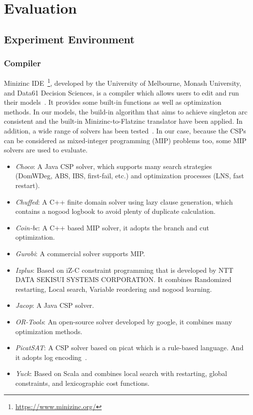 \chapter{Evaluation}
\label{cha:evaluation}
\section{Experiment Environment}
\subsection{Compiler}
\label{section:compiler}
Minizinc IDE~\footnote{\url{https://www.minizinc.org/}}, developed by the University of Melbourne, Monash University, and Data61 Decision Sciences, is a compiler which allows users to edit and run their models~\cite{r6}. It provides some built-in functions as well as optimization methods. In our models, the build-in algorithm that aims to achieve singleton arc consistent and the built-in Minizinc-to-Flatzinc translator have been applied. In addition, a wide range of solvers has been tested~\cite{r6}. In our case, because the CSPs can be considered as mixed-integer programming (MIP) problems too, some MIP solvers are used to evaluate.
\begin{itemize}
    \item \emph{Choco}: A Java CSP solver, which supports many search strategies (DomWDeg, ABS, IBS, first-fail, etc.) and optimization processes (LNS, fast restart).
    \item \emph{Chuffed}: A C++ finite domain solver using lazy clause generation, which contains a nogood logbook to avoid plenty of duplicate calculation.
    \item \emph{Coin-bc}: A C++ based MIP solver, it adopts the branch and cut optimization.
    \item \emph{Gurobi}: A commercial solver supports MIP.
    \item \emph{Izplus}: Based on iZ-C constraint programming that is developed by NTT DATA SEKISUI SYSTEMS CORPORATION. It combines Randomized restarting, Local search, Variable reordering and nogood learning.
    \item \emph{Jacop}: A Java CSP solver.
    \item \emph{OR-Tools}: An open-source solver developed by google, it combines many optimization methods.
    \item \emph{PicatSAT}: A CSP solver based on picat which is a rule-based language. And it adopts log encoding~\cite{r8}.
    \item \emph{Yuck}: Based on Scala and combines local search with restarting, global constraints, and lexicographic cost functions.
\end{itemize}
